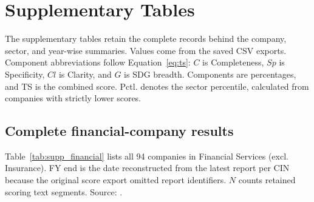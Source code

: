 \clearpage
\appendix
\section{Supplementary Tables}
\label{sec:supplementary}
\setcounter{table}{0}
\renewcommand{\thetable}{S\arabic{table}}
\renewcommand{\theHtable}{supp.\arabic{table}}

The supplementary tables retain the complete records behind the company, sector, and year-wise summaries. Values come from the saved CSV exports. Component abbreviations follow Equation~\eqref{eq:ts}: $C$ is Completeness, $Sp$ is Specificity, $Cl$ is Clarity, and $G$ is SDG breadth. Components are percentages, and TS is the combined score. Pctl. denotes the sector percentile, calculated from companies with strictly lower scores.

\subsection{Complete financial-company results}

Table~\ref{tab:supp_financial} lists all 94 companies in Financial Services (excl. Insurance). FY end is the date reconstructed from the latest report per CIN because the original score export omitted report identifiers. $N$ counts retained scoring text segments. Source: .

